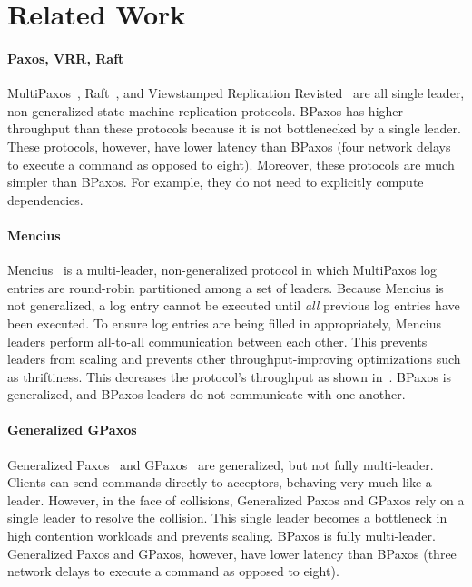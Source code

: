 \section{Related Work}

\paragraph{Paxos, VRR, Raft}
MultiPaxos~\cite{lamport1998part, lamport2001paxos, van2015paxos,
lampson2001abcd, mazieres2007paxos}, Raft~\cite{mazieres2007paxos}, and
Viewstamped Replication Revisted~\cite{liskov2012viewstamped} are all single
leader, non-generalized state machine replication protocols. BPaxos has higher
throughput than these protocols because it is not bottlenecked by a single
leader. These protocols, however, have lower latency than BPaxos (four network
delays to execute a command as opposed to eight). Moreover, these protocols are
much simpler than BPaxos. For example, they do not need to explicitly compute
dependencies.

\paragraph{Mencius}
Mencius~\cite{mao2008mencius} is a multi-leader, non-generalized protocol in
which MultiPaxos log entries are round-robin partitioned among a set of
leaders. Because Mencius is not generalized, a log entry cannot be executed
until \emph{all} previous log entries have been executed. To ensure log entries
are being filled in appropriately, Mencius leaders perform all-to-all
communication between each other. This prevents leaders from scaling and
prevents other throughput-improving optimizations such as thriftiness. This
decreases the protocol's throughput as shown in~\cite{moraru2013proof}. BPaxos
is generalized, and BPaxos leaders do not communicate with one another.

\paragraph{Generalized GPaxos}
Generalized Paxos~\cite{lamport2005generalized} and GPaxos~\cite{sutra2011fast}
are generalized, but not fully multi-leader. Clients can send commands directly
to acceptors, behaving very much like a leader. However, in the face of
collisions, Generalized Paxos and GPaxos rely on a single leader to resolve the
collision. This single leader becomes a bottleneck in high contention workloads
and prevents scaling. BPaxos is fully multi-leader. Generalized Paxos and
GPaxos, however, have lower latency than BPaxos (three network delays to
execute a command as opposed to eight).

